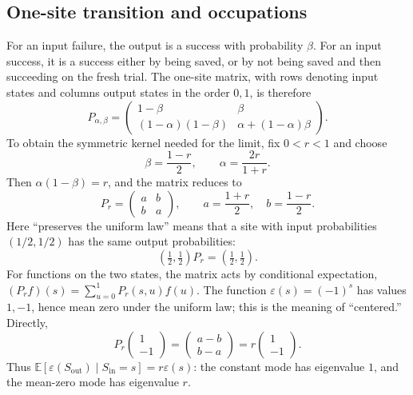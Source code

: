 \documentclass[11pt,reqno]{amsart}
\theoremstyle{remark}\newtheorem{remark}[theorem]{Remark}
\begin{document}
\subsection{One-site transition and occupations}
For an input failure, the output is a success with probability
$\beta$. For an input success, it is a success either by being saved,
or by not being saved and then succeeding on the fresh trial.
The one-site matrix, with rows denoting input states and columns output
states in the order $0,1$, is therefore
\[
P_{\alpha,\beta}=
\begin{pmatrix}
1-\beta&\beta\\
(1-\alpha)(1-\beta)&\alpha+(1-\alpha)\beta
\end{pmatrix}.
\]
To obtain the symmetric kernel needed for the limit, fix $0<r<1$ and
choose
\[
\beta=\frac{1-r}{2},\qquad \alpha=\frac{2r}{1+r}.
\]
Then $\alpha(1-\beta)=r$, and the matrix reduces to
\begin{equation}\label{eq:P}
P_r=\begin{pmatrix}a&b\\b&a\end{pmatrix},\qquad
a=\frac{1+r}{2},\quad b=\frac{1-r}{2}.
\end{equation}
Here ``preserves the uniform law'' means that a site with input
probabilities $(1/2,1/2)$ has the same output probabilities:
\[
(\tfrac12,\tfrac12)P_r=(\tfrac12,\tfrac12).
\]
For functions on the two states, the matrix acts by conditional
expectation, $(P_rf)(s)=\sum_{u=0}^1P_r(s,u)f(u)$.
The function $\varepsilon(s)=(-1)^s$ has values $1,-1$, hence mean zero
under the uniform law; this is the meaning of ``centered.'' Directly,
\[
P_r\begin{pmatrix}1\\-1\end{pmatrix}
=\begin{pmatrix}a-b\\b-a\end{pmatrix}
=r\begin{pmatrix}1\\-1\end{pmatrix}.
\]
Thus $\mathbb E[\varepsilon(S_{\mathrm{out}})\mid S_{\mathrm{in}}=s]
=r\varepsilon(s)$: the constant mode has eigenvalue $1$, and the
mean-zero mode has eigenvalue $r$.
\end{document}
